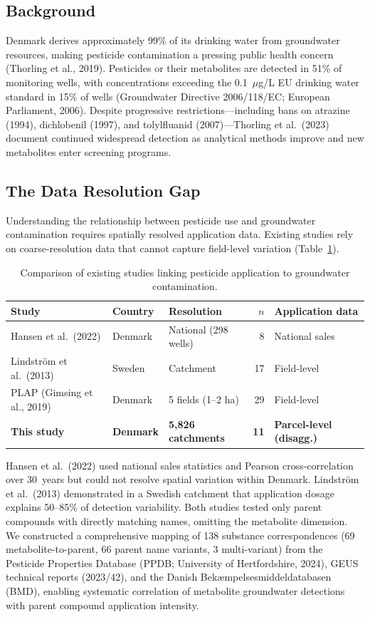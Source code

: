 \documentclass[12pt,a4paper]{article}
\begin{document}
\subsection{Background}

Denmark derives approximately 99\% of its drinking water from groundwater resources, making pesticide contamination a pressing public health concern (Thorling et al., 2019). Pesticides or their metabolites are detected in 51\% of monitoring wells, with concentrations exceeding the 0.1~$\mu$g/L EU drinking water standard in 15\% of wells (Groundwater Directive 2006/118/EC; European Parliament, 2006). Despite progressive restrictions---including bans on atrazine (1994), dichlobenil (1997), and tolylfluanid (2007)---Thorling et al.\ (2023) document continued widespread detection as analytical methods improve and new metabolites enter screening programs.

\subsection{The Data Resolution Gap}

Understanding the relationship between pesticide use and groundwater contamination requires spatially resolved application data. Existing studies rely on coarse-resolution data that cannot capture field-level variation (Table~\ref{tab:comparison}).

\begin{table}[H]
\centering
\caption{Comparison of existing studies linking pesticide application to groundwater contamination.}
\label{tab:comparison}
\footnotesize
\begin{tabular}{@{}lllrl@{}}
\toprule
Study & Country & Resolution & $n$ & Application data \\
\midrule
Hansen et al.\ (2022) & Denmark & National (298 wells) & 8 & National sales \\
Lindstr\"om et al.\ (2013) & Sweden & Catchment & 17 & Field-level \\
PLAP (Gimsing et al., 2019) & Denmark & 5 fields (1--2 ha) & 29 & Field-level \\
\textbf{This study} & \textbf{Denmark} & \textbf{5,826 catchments} & \textbf{11} & \textbf{Parcel-level (disagg.)} \\
\bottomrule
\end{tabular}
\end{table}

Hansen et al.\ (2022) used national sales statistics and Pearson cross-correlation over 30~years but could not resolve spatial variation within Denmark. Lindstr\"om et al.\ (2013) demonstrated in a Swedish catchment that application dosage explains 50--85\% of detection variability. Both studies tested only parent compounds with directly matching names, omitting the metabolite dimension. We constructed a comprehensive mapping of 138 substance correspondences (69 metabolite-to-parent, 66 parent name variants, 3 multi-variant) from the Pesticide Properties Database (PPDB; University of Hertfordshire, 2024), GEUS technical reports (2023/42), and the Danish Bek\ae mpelsesmiddeldatabasen (BMD), enabling systematic correlation of metabolite groundwater detections with parent compound application intensity.
\end{document}
